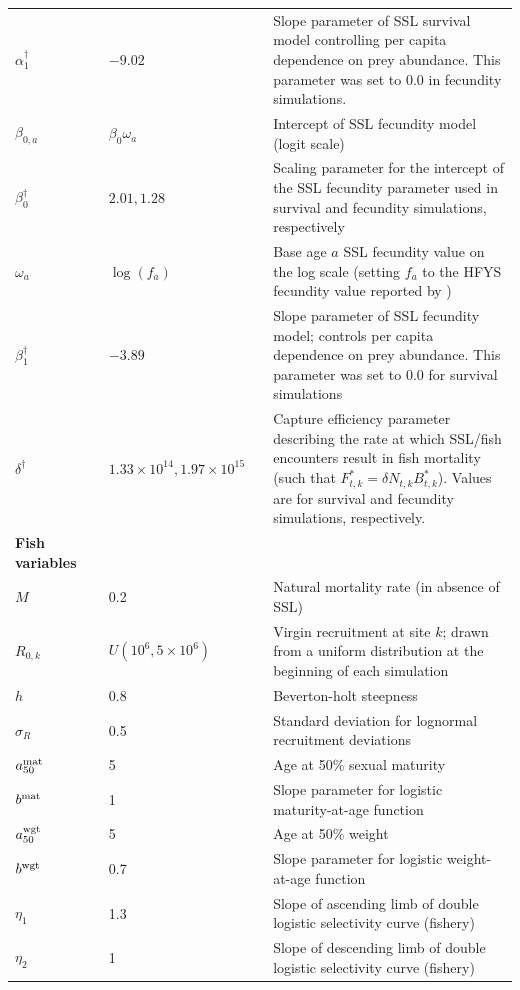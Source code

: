 \documentclass[11pt]{article}
\begin{document}
\begin{longtable}{p{2.5cm}lp{2.7cm}l p{8cm}}
$\alpha_1^\dag$ & & $-9.02$ & & Slope parameter of SSL survival model controlling per capita dependence on prey abundance.  This parameter was set to 0.0 in fecundity simulations. \\
$\beta_{0,a}$ & & $\beta_0 \omega_a$ & & Intercept of SSL fecundity model (logit scale) \\
$\beta_0^\dag$ & & $2.01,1.28$ & & Scaling parameter for the intercept of the SSL fecundity parameter used in survival and fecundity simulations, respectively \\
$\omega_a$ & & $\log(f_a)$ & & Base age $a$ SSL fecundity value on the log scale (setting $f_a$ to the HFYS fecundity value reported by \citet{HolmesEtAl2007}) \\
$\beta_1^\dag$ & & $-3.89$ & & Slope parameter of SSL fecundity model; controls per capita dependence
                    on prey abundance.  This parameter was set to 0.0 for survival simulations \\
$\delta^\dag$ & & $1.33 \times 10^{14}, 1.97 \times 10^{15}  $ & & Capture efficiency parameter describing the rate at which SSL/fish encounters result in fish mortality (such that $F_{t,k}^*=\delta N_{t,k} B_{t,k}^*$).  Values are for survival and fecundity simulations, respectively. \\
\midrule
\multicolumn{1}{l}{\textbf{Fish variables}}  \\
$M$ & & 0.2 & & Natural mortality rate (in absence of SSL) \\ [2pt]
$R_{0,k}$ & & $U(10^6,5 \times 10^6)$ & & Virgin recruitment at site $k$; drawn from a uniform distribution at the beginning of each simulation \\
$h$ & & 0.8 & & Beverton-holt steepness \\
$\sigma_R$ & & 0.5 & & Standard deviation for lognormal recruitment deviations \\
$a_{50}^{\rm mat}$ & & 5 & & Age at 50\% sexual maturity \\
$b^{\rm mat}$ & & 1 & & Slope parameter for logistic maturity-at-age function \\
$a_{50}^{\rm wgt}$ & & 5 & & Age at 50\% weight \\
$b^{\rm wgt}$ & & 0.7 & & Slope parameter for logistic weight-at-age function \\
$\eta_1$ & & 1.3 & & Slope of ascending limb of double logistic selectivity curve (fishery)\\
$\eta_2$ & & 1 & & Slope of descending limb of double logistic selectivity curve (fishery) \\

\end{longtable}
\end{document}
